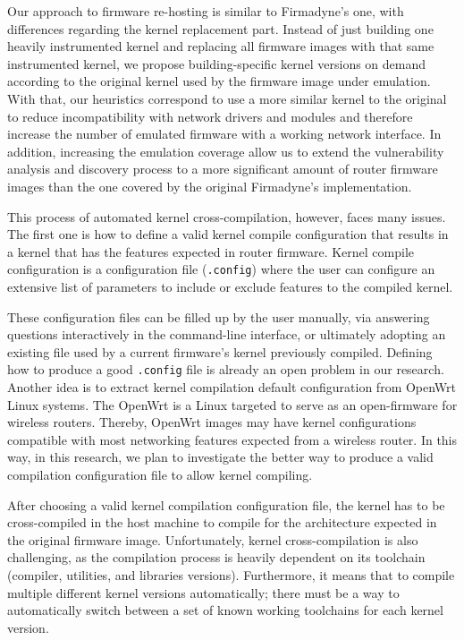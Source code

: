 Our approach to firmware re-hosting is similar to Firmadyne's one, with differences regarding the kernel replacement part. Instead of just building one heavily instrumented kernel and replacing all firmware images with that same instrumented kernel, we propose building-specific kernel versions on demand according to the original kernel used by the firmware image under emulation. With that, our heuristics correspond to use a more similar kernel to the original to reduce incompatibility with network drivers and modules and therefore increase the number of emulated firmware with a working network interface. In addition, increasing the emulation coverage allow us to extend the vulnerability analysis and discovery process to a more significant amount of router firmware images than the one covered by the original Firmadyne's implementation.

This process of automated kernel cross-compilation, however, faces many issues. The first one is how to define a valid kernel compile configuration that results in a kernel that has the features expected in router firmware. Kernel compile configuration is a configuration file ({\tt .config}) where the user can configure an extensive list of parameters to include or exclude features to the compiled kernel.

These configuration files can be filled up by the user manually, via answering questions interactively in the command-line interface, or ultimately adopting an existing file used by a current firmware's kernel previously compiled. Defining how to produce a good {\tt .config} file is already an open problem in our research. Another idea is to extract kernel compilation default configuration from OpenWrt Linux systems. The OpenWrt is a Linux targeted to serve as an open-firmware for wireless routers. Thereby, OpenWrt images may have kernel configurations compatible with most networking features expected from a wireless router. In this way, in this research, we plan to investigate the better way to produce a valid compilation configuration file to allow kernel compiling.

After choosing a valid kernel compilation configuration file, the kernel has to be cross-compiled in the host machine to compile for the architecture expected in the original firmware image. Unfortunately, kernel cross-compilation is also challenging, as the compilation process is heavily dependent on its toolchain (compiler, utilities, and libraries versions). Furthermore, it means that to compile multiple different kernel versions automatically; there must be a way to automatically switch between a set of known working toolchains for each kernel version.

